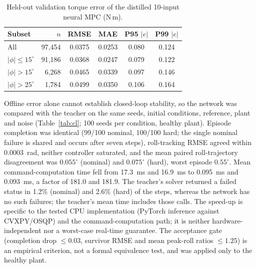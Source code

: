 \documentclass[preprint,12pt,authoryear=false]{elsarticle}
\theoremstyle{remark}\newtheorem{remark}{Remark}
\theoremstyle{plain}\newtheorem{proposition}{Proposition}\newtheorem{lemma}{Lemma}
\theoremstyle{definition}\newtheorem{assumption}{Assumption}
\begin{document}
\begin{table}[t]\centering\small
\caption{Held-out validation torque error of the distilled 10-input neural MPC (N\,m).}\label{tab:val10}
\begin{tabular}{lrcccc}\toprule
Subset & $n$ & RMSE & MAE & P95 $|e|$ & P99 $|e|$\\\midrule
All & 97{,}454 & 0.0375 & 0.0253 & 0.080 & 0.124\\
$|\phi|\le15^\circ$ & 91{,}186 & 0.0368 & 0.0247 & 0.079 & 0.122\\
$|\phi|>15^\circ$ & 6{,}268 & 0.0465 & 0.0339 & 0.097 & 0.146\\
$|\phi|>25^\circ$ & 1{,}784 & 0.0499 & 0.0350 & 0.106 & 0.164\\\bottomrule
\end{tabular}
\end{table}

Offline error alone cannot establish closed-loop stability, so the network was compared with the teacher on the same seeds, initial conditions, reference, plant and noise (Table~\ref{tab:cl}; 100 seeds per condition, healthy plant). Episode completion was identical (99/100 nominal, 100/100 hard; the single nominal failure is shared and occurs after seven steps), roll-tracking RMSE agreed within \SI{0.0003}{rad}, neither controller saturated, and the mean paired roll-trajectory disagreement was $0.055^\circ$ (nominal) and $0.075^\circ$ (hard), worst episode $0.55^\circ$. Mean command-computation time fell from \SI{17.3}{ms} and \SI{16.9}{ms} to \SI{0.095}{ms} and \SI{0.093}{ms}, a factor of 181.0 and 181.9. The teacher's solver returned a failed status in 1.2\% (nominal) and 2.6\% (hard) of the steps, whereas the network has no such failures; the teacher's mean time includes those calls. The speed-up is specific to the tested CPU implementation (PyTorch inference against CVXPY/OSQP) and the command-computation path; it is neither hardware-independent nor a worst-case real-time guarantee. The acceptance gate (completion drop $\le0.03$, survivor RMSE and mean peak-roll ratios $\le1.25$) is an empirical criterion, not a formal equivalence test, and was applied only to the healthy plant.
\end{document}
